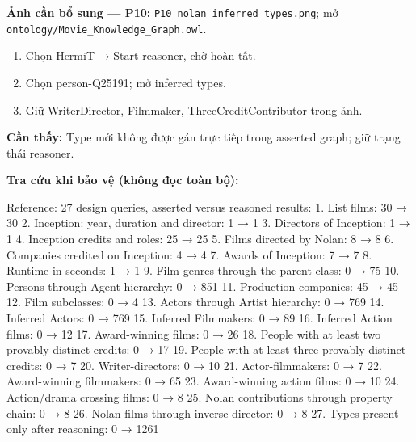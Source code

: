 \documentclass[
  11pt,
]{article}
\providecommand{\tightlist}{%
  \setlength{\itemsep}{0pt}\setlength{\parskip}{0pt}}
\begin{document}
\textbf{Ảnh cần bổ sung --- P10:}
\texttt{P10\_\allowbreak{}nola\allowbreak{}n\_\allowbreak{}inferr\allowbreak{}ed\_\allowbreak{}types\allowbreak{}.\allowbreak{}png};
mở
\texttt{ontology\allowbreak{}/\allowbreak{}\allowbreak{}Movie\_\allowbreak{}\allowbreak{}K\allowbreak{}nowledge\allowbreak{}\_\allowbreak{}\allowbreak{}Graph.\allowbreak{}o\allowbreak{}wl}.

\begin{enumerate}
\def\labelenumi{\arabic{enumi}.}
\tightlist
\item
  Chọn HermiT → Start reasoner, chờ hoàn tất.
\item
  Chọn person-\allowbreak{}\allowbreak{}Q\allowbreak{}25191; mở inferred
  types.
\item
  Giữ Writer\allowbreak{}Di\allowbreak{}rector, Filmmaker,
  Three\allowbreak{}Cre\allowbreak{}dit\allowbreak{}Contr\allowbreak{}ibutor
  trong ảnh.
\end{enumerate}

\textbf{Cần thấy:} Type mới không được gán trực tiếp trong asserted
graph; giữ trạng thái reasoner.

\textbf{Tra cứu khi bảo vệ (không đọc toàn bộ):}

Reference: 27 design queries, asserted versus reasoned results: 1. List
films: 30 → 30 2. Inception: year, duration and director: 1 → 1 3.
Directors of Inception: 1 → 1 4. Inception credits and roles: 25 → 25 5.
Films directed by Nolan: 8 → 8 6. Companies credited on Inception: 4 → 4
7. Awards of Inception: 7 → 7 8. Runtime in seconds: 1 → 1 9. Film
genres through the parent class: 0 → 75 10. Persons through Agent
hierarchy: 0 → 851 11. Production companies: 45 → 45 12. Film
subclasses: 0 → 4 13. Actors through Artist hierarchy: 0 → 769 14.
Inferred Actors: 0 → 769 15. Inferred Filmmakers: 0 → 89 16. Inferred
Action films: 0 → 12 17. Award-\allowbreak{}wi\allowbreak{}nning films:
0 → 26 18. People with at least two provably distinct credits: 0 → 17
19. People with at least three provably distinct credits: 0 → 7 20.
Writer-\allowbreak{}d\allowbreak{}irectors\allowbreak{}:\allowbreak{} 0
→ 10 21.
Actor-\allowbreak{}fi\allowbreak{}lmmakers\allowbreak{}:\allowbreak{} 0
→ 7 22. Award-\allowbreak{}wi\allowbreak{}nning filmmakers: 0 → 65 23.
Award-\allowbreak{}wi\allowbreak{}nning action films: 0 → 10 24.
Action/drama crossing films: 0 → 8 25. Nolan contribu\allowbreak{}tions
through property chain: 0 → 8 26. Nolan films through inverse director:
0 → 8 27. Types present only after reasoning: 0 → 1261
\end{document}
